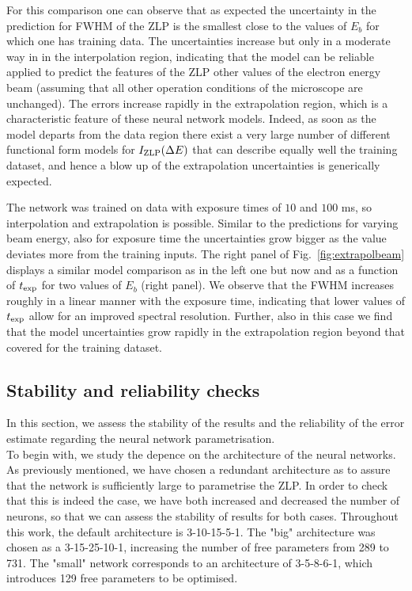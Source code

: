 For this comparison one can observe that as expected the uncertainty in the  prediction for FWHM
of the ZLP is the smallest close to the values of $E_b$ for which one has training data.
%
The uncertainties increase but only in a moderate way in in the interpolation region, indicating that
the model can be reliable applied to predict the features of the ZLP other values of the electron
energy beam (assuming that all other operation conditions of the microscope are unchanged).
%
The errors increase rapidly in the extrapolation region, which is a characteristic feature of
these neural network models.
%
Indeed, as soon as the model departs from the data region there exist a very large
number of different functional form models for $I_{\rm ZLP}(\Delta E)$ that can describe equally well
the training dataset, and hence a blow up of the extrapolation uncertainties is generically expected.

The network was trained on data with exposure times of $10$ and $100$ ms,
so interpolation and extrapolation is possible. Similar to the predictions for varying beam energy, also for exposure time the uncertainties grow bigger as the value deviates more from the training inputs.
%
The right panel of Fig.~\ref{fig:extrapolbeam} displays a similar model
comparison as in the left one but now and as a function of $t_{\rm exp}$ for two values of $E_b$ (right panel).
%
We observe that the FWHM increases roughly in a linear manner with the exposure time, indicating
that lower values of $t_{\rm exp}$ allow for an improved spectral resolution.
%
Further, also in this case we find that the model uncertainties grow rapidly in the
extrapolation region beyond that covered for the training dataset.


\subsection{Stability and reliability checks}
In this section, we assess the stability of the results and the reliability of the 
error estimate regarding the neural network parametrisation.\\

To begin with, we study the depence on the architecture of the neural networks. 
As previously mentioned, we have chosen a redundant architecture as to assure that the network
is sufficiently large to parametrise the ZLP.
%
In order to check that this is indeed the case, we have both increased and decreased the
number of neurons, so that we can assess the stability of results for both cases.
%
Throughout this work, the default architecture is 3-10-15-5-1. 
The "big" architecture was chosen as a 3-15-25-10-1, increasing the number of free
parameters from 289 to 731. 
%
The "small" network corresponds to an architecture of 3-5-8-6-1, which introduces 129
free parameters to be optimised. 

